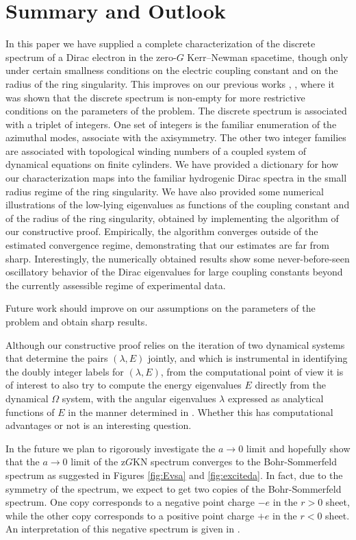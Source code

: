 \documentclass[11 pt]{article}
\renewcommand\({\left(}
\renewcommand\){\right)}
\newcommand\<{\langle}
\renewcommand\>{\rangle}
\newcommand\8{\infty}
\begin{document}
\section{Summary and Outlook}

In this paper we have supplied a complete characterization of the discrete spectrum of a Dirac electron in the zero-$G$ Kerr--Newman
spacetime, though only under certain smallness conditions on the electric coupling constant and on the radius of the ring singularity.
 This improves on our previous works \cite{KTZzGKNDa}, \cite{KTZzGKNDb}, \cite{KTZzGKNDc} where it was shown that the discrete
spectrum is non-empty for more restrictive conditions on the parameters of the problem. 
 The discrete spectrum is associated with a triplet of integers.
 One set of integers is the familiar enumeration of the azimuthal modes, associate with the axisymmetry. 
 The other two integer families are associated with topological winding numbers of a coupled system of dynamical equations
on finite cylinders.
 We have provided a dictionary for how our characterization maps into the familiar hydrogenic Dirac spectra in the small radius
regime of the ring singularity. 
 We have also provided some numerical illustrations of the low-lying eigenvalues as functions of the coupling constant and of the
radius of the ring singularity, obtained by implementing the algorithm of our constructive proof. 
 Empirically, the algorithm converges outside of the estimated convergence regime, demonstrating that our estimates are far from sharp.
 Interestingly, the numerically obtained results show some never-before-seen oscillatory behavior of the Dirac eigenvalues for large
coupling constants beyond the currently assessible regime of experimental data. 
 
Future work should improve on our assumptions on the parameters of the problem and obtain sharp results.
 
 Although our constructive proof relies on the iteration of two dynamical systems that determine the pairs $(\lambda, E)$ jointly, 
and which is instrumental in identifying the doubly integer labels for $(\lambda,E)$, from the computational point of view it is of
interest to also try to compute the energy eigenvalues $E$ directly from the dynamical $\Omega$ system, with the angular 
eigenvalues $\lambda$ expressed as analytical functions of $E$ in the manner determined in \cite{BSW}. 
 Whether this has computational advantages or not is an interesting question.
 
 In the future we plan to rigorously investigate the $a \to 0$ limit and hopefully show that the $a \to 0$ limit of the z$G$KN spectrum converges to the Bohr-Sommerfeld spectrum as suggested in Figures \ref{fig:Evsa} and \ref{fig:exciteda}. In fact, due to the symmetry of the spectrum, we expect to get two copies of the Bohr-Sommerfeld spectrum. One copy corresponds to a negative point charge $-e$ in the $r > 0$ sheet, while the other copy corresponds to a positive point charge $+e$ in the $r < 0$ sheet. An interpretation of this negative spectrum is given in \cite{KTZzGKNDc}. 
\end{document}
